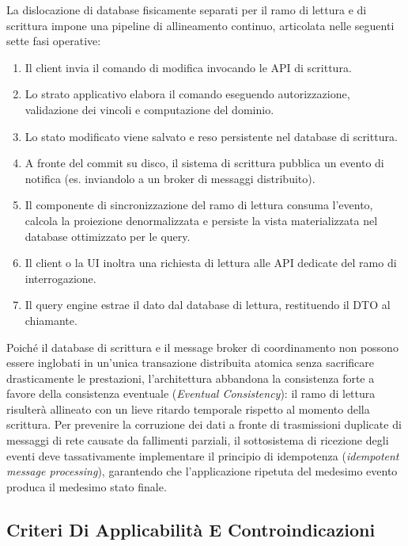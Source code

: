\documentclass[11pt, a4paper]{article}
\begin{document}
La dislocazione di database fisicamente separati per il ramo di lettura e di scrittura impone una pipeline di allineamento continuo, articolata nelle seguenti sette fasi operative:
\begin{enumerate}[noitemsep]
    \item Il client invia il comando di modifica invocando le API di scrittura.
    \item Lo strato applicativo elabora il comando eseguendo autorizzazione, validazione dei vincoli e computazione del dominio.
    \item Lo stato modificato viene salvato e reso persistente nel database di scrittura.
    \item A fronte del commit su disco, il sistema di scrittura pubblica un evento di notifica (es. inviandolo a un broker di messaggi distribuito).
    \item Il componente di sincronizzazione del ramo di lettura consuma l'evento, calcola la proiezione denormalizzata e persiste la vista materializzata nel database ottimizzato per le query.
    \item Il client o la UI inoltra una richiesta di lettura alle API dedicate del ramo di interrogazione.
    \item Il query engine estrae il dato dal database di lettura, restituendo il DTO al chiamante.
\end{enumerate}


Poiché il database di scrittura e il message broker di coordinamento non possono essere inglobati in un'unica transazione distribuita atomica senza sacrificare drasticamente le prestazioni, l'architettura abbandona la consistenza forte a favore della consistenza eventuale (\emph{Eventual Consistency}): il ramo di lettura risulterà allineato con un lieve ritardo temporale rispetto al momento della scrittura. Per prevenire la corruzione dei dati a fronte di trasmissioni duplicate di messaggi di rete causate da fallimenti parziali, il sottosistema di ricezione degli eventi deve tassativamente implementare il principio di idempotenza (\emph{idempotent message processing}), garantendo che l'applicazione ripetuta del medesimo evento produca il medesimo stato finale.

\subsection{Criteri Di Applicabilità E Controindicazioni}
\end{document}
